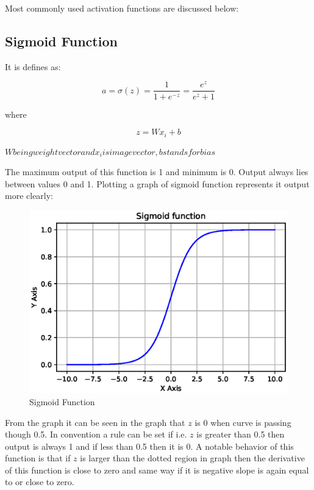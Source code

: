 \documentclass[11pt]{article}
\begin{document}
Most commonly used activation functions are discussed below:

\subsection{Sigmoid Function}
It is defines as:

\begin{equation}
a = \sigma(z) = \frac{1}{1+e^{-z}}=\frac{e^{z}}{e^{z}+1}
\end{equation}

where

\begin{equation}
z = Wx_i + b
\end{equation}

$W being weight vector and x_i is image vector, b stands for bias$


The maximum output of this function is 1 and minimum is 0. Output always lies between values 0 and 1. Plotting a graph of sigmoid function represents it output more clearly:

\begin{figure}[H]
	\includegraphics[width=\linewidth]{files/cnn_architecture/sigmoid.eps}
	\caption{Sigmoid Function}
	\label{fig: Sigmoid}
\end{figure}

From the graph it can be seen in the graph that $z$ is 0 when curve is passing though 0.5. In convention a rule can be set if i.e. $z$ is greater than 0.5 then output is always 1 and if less than 0.5 then it is 0. A notable behavior of this function is that if $z$ is larger than the dotted region in graph then the derivative of this function is close to zero and same way if it is negative slope is again equal to or close to zero. 
\end{document}
